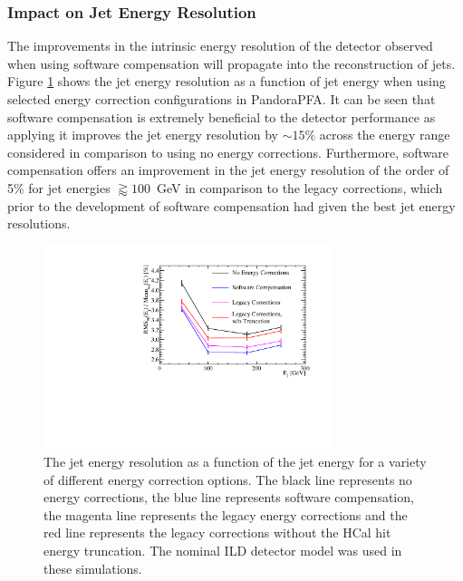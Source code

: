 
\subsubsection{Impact on Jet Energy Resolution}
The improvements in the intrinsic energy resolution of the detector observed when using software compensation will propagate into the reconstruction of jets.  Figure \ref{fig:jersoftcomp} shows the jet energy resolution as a function of jet energy when using selected energy correction configurations in PandoraPFA.  It can be seen that software compensation is extremely beneficial to the detector performance as applying it improves the jet energy resolution by $\sim 15 \%$ across the energy range considered in comparison to using no energy corrections.  Furthermore, software compensation offers an improvement in the jet energy resolution of the order of 5\% for jet energies $\gtrapprox 100$~GeV in comparison to the legacy corrections, which prior to the development of software compensation had given the best jet energy resolutions.

\begin{figure}[h!]
\includegraphics[width=0.75\textwidth]{EnergyEstimators/Plots/SoftComp/JetEnergyResolution/JER_vs_JetEnergy_Default.pdf}
\caption[The jet energy resolution as a function of the jet energy for a variety of different energy correction options.  The black line represents no energy corrections, the blue line represents software compensation, the magenta line represents the legacy energy corrections and the red line represents the legacy corrections without the HCal hit energy truncation.  The nominal ILD detector model was used in these simulations.]{The jet energy resolution as a function of the jet energy for a variety of different energy correction options.  The black line represents no energy corrections, the blue line represents software compensation, the magenta line represents the legacy energy corrections and the red line represents the legacy corrections without the HCal hit energy truncation.  The nominal ILD detector model was used in these simulations.}
\label{fig:jersoftcomp}
\end{figure}

